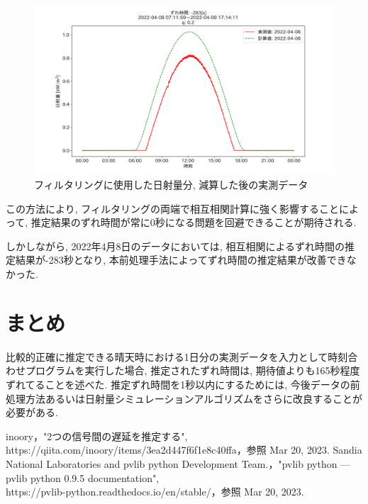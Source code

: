 \documentclass[a4j,12pt,]{jarticle}
\begin{document}
\begin{figure}[H]
  \begin{center}
    \includegraphics[width=160mm]{2022-04-08_mask_by_q_corr.png}
    \caption{フィルタリングに使用した日射量分, 減算した後の実測データ}
    \label{p10}
  \end{center}
\end{figure}

この方法により, フィルタリングの両端で相互相関計算に強く影響することによって, 推定結果のずれ時間が常に0秒になる問題を回避できることが期待される.

しかしながら, 2022年4月8日のデータにおいては, 相互相関によるずれ時間の推定結果が-283秒となり, 本前処理手法によってずれ時間の推定結果が改善できなかった.

\section{まとめ}
比較的正確に推定できる晴天時における1日分の実測データを入力として時刻合わせプログラムを実行した場合, 推定されたずれ時間は, 期待値よりも165秒程度ずれてることを述べた. 推定ずれ時間を1秒以内にするためには, 今後データの前処理方法あるいは日射量シミュレーションアルゴリズムをさらに改良することが必要がある.


\begin{thebibliography}{5}
  inoory，"2つの信号間の遅延を推定する",\\ https://qiita.com/inoory/items/3ea2d447f6f1e8c40ffa，参照 Mar 20, 2023.
  Sandia National Laboratories and pvlib python Development Team.，"pvlib python — pvlib python 0.9.5 documentation",\\ https://pvlib-python.readthedocs.io/en/stable/，参照 Mar 20, 2023.
\end{thebibliography}
\end{document}
